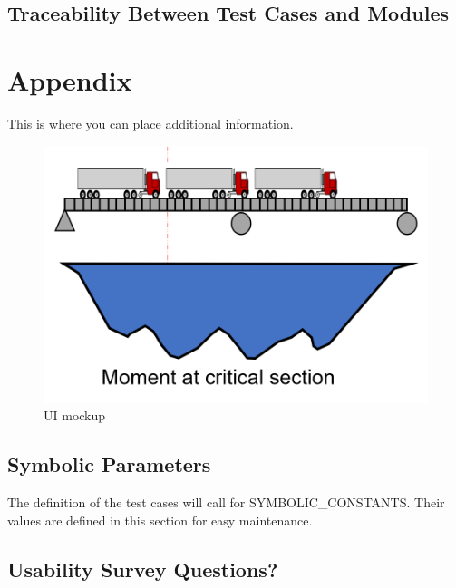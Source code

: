 \documentclass[12pt, titlepage]{article}
\begin{document}
\subsection{Traceability Between Test Cases and Modules}

				




\newpage

\section{Appendix}

This is where you can place additional information.

\begin{figure}[]
  \includegraphics[width=\linewidth]{UI.png}
  \caption{UI mockup}
  \label {fig:ui-mockup}
\end{figure}

\subsection{Symbolic Parameters}

The definition of the test cases will call for SYMBOLIC\_CONSTANTS.
Their values are defined in this section for easy maintenance.

\subsection{Usability Survey Questions?}
\end{document}
